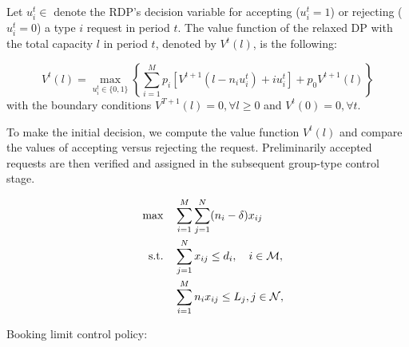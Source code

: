 Let $u_{i}^{t} \in $ denote the RDP's decision variable for accepting ($u_{i}^{t} = 1$) or rejecting ($u_{i}^{t} = 0$) a type $i$ request in period $t$. The value function of the relaxed DP with the total capacity $l$ in period $t$, denoted by $V^{t}(l)$, is the following:

\begin{equation}\label{DP_relaxed}
V^{t}(l) =  \max_{u_{i}^{t} \in \{0,1\}} \left\{ \sum_{i=1}^{M} p_i \left[V^{t+1}(l-n_i u_{i}^{t})+ i u_{i}^{t}\right] + p_0 V^{t+1}(l)\right\}
\end{equation}
with the boundary conditions $V^{T+1}(l) =0, \forall l \geq 0$ and $V^{t}(0) =0, \forall t$.


To make the initial decision, we compute the value function $V^{t}(l)$ and compare the values of accepting versus rejecting the request. Preliminarily accepted requests are then verified and assigned in the subsequent group-type control stage.

\newpage






\begin{align}
    \quad \max \quad & \sum_{i=1}^{M}  \sum_{j= 1}^{N} (n_i - \delta) x_{ij} \label{theta_deter} \\
    \text {s.t.} \quad & \sum_{j= 1}^{N} x_{ij} \leq d_{i}, \quad i \in \mathcal{M}, \notag \\ 
    & \sum_{i=1}^{M} n_{i} x_{ij} \leq L_j, j \in \mathcal{N}, \notag 
\end{align}

Booking limit control policy:

